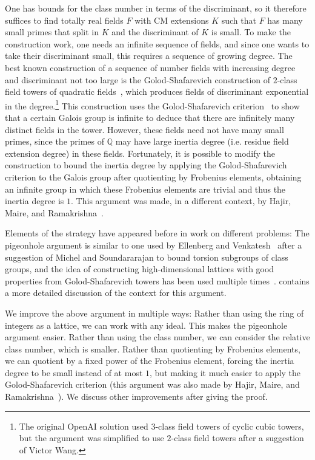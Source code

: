 \documentclass[12pt]{amsart}
\theoremstyle{remark}
\theoremstyle{definition}
\begin{document}
One has bounds for the class number in terms of the discriminant, so it therefore suffices to find totally real fields $F$ with CM extensions $K$ such that $F$ has many small primes that split in $K$ and the discriminant of $K$ is small. To make the construction work, one needs an infinite sequence of fields, and since one wants to take their discriminant small, this requires a sequence of growing degree. The best known construction of a sequence of number fields with increasing degree and discriminant not too large is the Golod-Shafarevich construction of $2$-class field towers of quadratic fields~\cite{GolodShafarevich}, which produces fields of discriminant exponential in the degree.\footnote{The original OpenAI solution used $3$-class field towers of cyclic cubic towers, but the argument was simplified to use $2$-class field towers after a suggestion of Victor Wang.} This construction uses the Golod-Shafarevich criterion~\cite{GolodShafarevich} to show that a certain Galois group is infinite to deduce that there are infinitely many distinct fields in the tower. However, these fields need not have many small primes, since the primes of $\mathbb Q$ may have large inertia degree (i.e. residue field extension degree) in these fields. Fortunately, it is possible to modify the construction to bound the inertia degree by applying the Golod-Shafarevich criterion to the Galois group after quotienting by Frobenius elements, obtaining an infinite group in which these Frobenius elements are trivial and thus the inertia degree is $1$. This argument was made, in a different context, by Hajir, Maire, and Ramakrishna~\cite{hajir2021shafarevich}.

Elements of the strategy have appeared before in work on different problems: The pigeonhole argument is similar to one used by Ellenberg and Venkatesh~\cite{Ellenberg2007} after a suggestion of Michel and Soundararajan to bound torsion subgroups of class groups, and the idea of constructing high-dimensional lattices with good properties from Golod-Shafarevich towers has been used multiple times~\cite{Lenstra1986Codes,LitsynTsfasman1987Constructive}. \cite{humanwriteup} contains a more detailed discussion of the context for this argument.

We improve the above argument in multiple ways: Rather than using the ring of integers as a lattice, we can work with any ideal. This makes the pigeonhole argument easier. Rather than using the class number, we can consider the relative class number, which is smaller. Rather than quotienting by Frobenius elements, we can quotient by a fixed power of the Frobenius element, forcing the inertia degree to be small instead of at most $1$, but making it much easier to apply the Golod-Shafarevich criterion (this argument was also made by Hajir, Maire, and Ramakrishna~\cite{hajir2021shafarevich}). We discuss other improvements after giving the proof.
\end{document}

